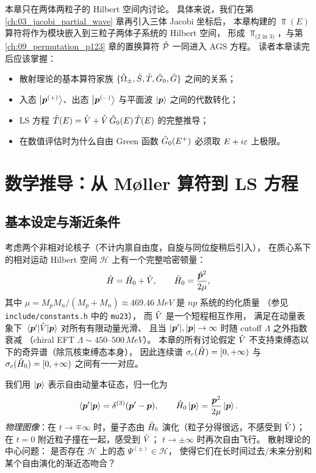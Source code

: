 本章只在两体两粒子的 Hilbert 空间内讨论。
具体来说，我们在第 \ref{ch:03_jacobi_partial_wave} 章再引入三体 Jacobi 坐标后，
本章构建的 $\Top(E)$ 算符将作为模块嵌入到三粒子两体子系统的 Hilbert 空间，
形成 $\Top_{\text{(2 in 3)}}$，与第 \ref{ch:09_permutation_p123} 章的置换算符 $\hat{\mathcal{P}}$ 一同进入 AGS 方程。
读者本章读完后应该掌握：
\begin{itemize}
  \item 散射理论的基本算符家族 $\{\hat{\Omega}_{\pm}, \hat{S}, \hat{T}, \hat{G}_0, \hat{G}\}$ 之间的关系；
  \item 入态 $\ket{\bm{p}^{(+)}}$、出态 $\ket{\bm{p}^{(-)}}$ 与平面波 $\ket{\bm{p}}$ 之间的代数转化；
  \item LS 方程
    $\hat{T}(E) = \hat{V} + \hat{V}\, \hat{G}_0(E)\, \hat{T}(E)$ 的完整推导；
  \item 在数值评估时为什么自由 Green 函数 $\hat{G}_0(E^+)$ 必须取 $E + i\varepsilon$ 上极限。
\end{itemize}

\section{数学推导：从 Møller 算符到 LS 方程}
\label{sec:ch01-math}

\subsection{基本设定与渐近条件}

考虑两个非相对论核子（不计内禀自由度，自旋与同位旋稍后引入），
在质心系下的相对运动 Hilbert 空间 $\mathcal{H}$ 上有一个完整哈密顿量：
\begin{equation}
  \hat{H} = \hat{H}_0 + \hat{V}, \qquad \hat{H}_0 = \frac{\hat{\bm{p}}^2}{2\mu},
  \label{eq:ch01-Hsplit}
\end{equation}
其中 $\mu = M_p M_n / (M_p + M_n) \approx \SI{469.46}{MeV}$ 是 $np$ 系统的约化质量
（参见 \texttt{include/constants.h} 中的 \texttt{mu23}），
而 $\hat{V}$ 是一个短程相互作用，
满足在动量表象下 $\matrixel{\bvec{p}'}{\Vop}{\bvec{p}}$ 对所有有限动量光滑、
且当 $|\bm{p}'|, |\bm{p}| \to \infty$ 时随 cutoff $\Lambda$ 之外指数衰减
（chiral EFT $\Lambda \sim 450\text{--}500\,\si{MeV}$）。
本章的所有讨论假定 $\hat{V}$ 不支持束缚态以下的奇异谱（除氘核束缚态本身），
因此连续谱 $\sigma_c(\hat{H}) = [0, +\infty)$ 与 $\sigma_c(\hat{H}_0) = [0, +\infty)$ 之间有一一对应。

我们用 $\ket{\bm{p}}$ 表示自由动量本征态，归一化为
\begin{equation}
  \braket{\bm{p}'}{\bm{p}} = \delta^{(3)}(\bm{p}' - \bm{p}),
  \qquad
  \hat{H}_0 \ket{\bm{p}} = \frac{\bm{p}^2}{2\mu} \ket{\bm{p}}.
  \label{eq:ch01-plane-wave}
\end{equation}
\textit{物理图像}：在 $t \to \mp\infty$ 时，量子态由 $\hat{H}_0$ 演化（粒子分得很远，不感受到 $\hat{V}$）；
在 $t = 0$ 附近粒子撞在一起，感受到 $\hat{V}$；
$t \to \pm\infty$ 时再次自由飞行。
散射理论的中心问题：
是否存在 $\mathcal{H}$ 上的态 $\Psi^{(\pm)} \in \mathcal{H}$，
使得它们在长时间过去/未来分别和某个自由演化的渐近态吻合？

